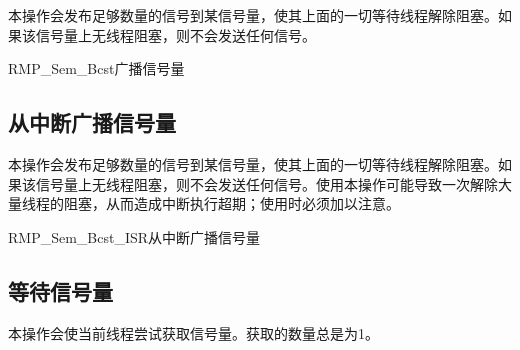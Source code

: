 本操作会发布足够数量的信号到某信号量，使其上面的一切等待线程解除阻塞。如果该信号量上无线程阻塞，则不会发送任何信号。

\begin{apidesc}{RMP\_Sem\_Bcst}{广播信号量}
    \begin{apiparams}
    \end{apiparams}
    \begin{apiret}
    \end{apiret}
\end{apidesc}

\subsection{从中断广播信号量}\label{subsec:broadcast-a-semaphore-from-an-interrupt}

本操作会发布足够数量的信号到某信号量，使其上面的一切等待线程解除阻塞。如果该信号量上无线程阻塞，则不会发送任何信号。使用本操作可能导致一次解除大量线程的阻塞，从而造成中断执行超期；使用时必须加以注意。

\begin{apidesc}{RMP\_Sem\_Bcst\_ISR}{从中断广播信号量}
    \begin{apiparams}
    \end{apiparams}
    \begin{apiret}
    \end{apiret}
\end{apidesc}

\subsection{等待信号量}\label{subsec:wait-on-a-semaphore}

本操作会使当前线程尝试获取信号量。获取的数量总是为1。

